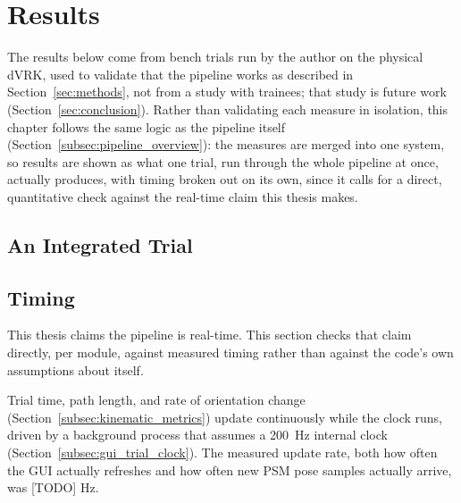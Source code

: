 ﻿\section{Results}
\label{sec:results}

The results below come from bench trials run by the author on the
physical dVRK, used to validate that the pipeline works as described
in Section~\ref{sec:methods}, not from a study with trainees; that
study is future work (Section~\ref{sec:conclusion}). Rather than
validating each measure in isolation, this chapter follows the same
logic as the pipeline itself (Section~\ref{subsec:pipeline_overview}):
the measures are merged into one system, so results are shown as what
one trial, run through the whole pipeline at once, actually produces,
with timing broken out on its own, since it calls for a direct,
quantitative check against the real-time claim this thesis makes.

\subsection{An Integrated Trial}
\label{subsec:results_integrated_trial}


\subsection{Timing}
\label{subsec:results_timing}

This thesis claims the pipeline is real-time. This section checks
that claim directly, per module, against measured timing rather than
against the code's own assumptions about itself.

Trial time, path length, and rate of orientation change
(Section~\ref{subsec:kinematic_metrics}) update continuously while the
clock runs, driven by a background process that assumes a 200~Hz
internal clock (Section~\ref{subsec:gui_trial_clock}). The measured
update rate, both how often the GUI actually refreshes and how often
new PSM pose samples actually arrive, was [TODO] Hz.

